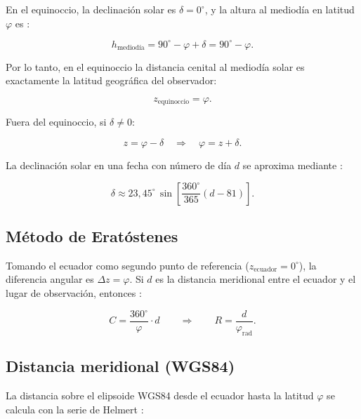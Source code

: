 En el equinoccio, la declinación solar es $\delta = 0^\circ$, y la altura
al mediodía en latitud $\varphi$ es \citep{PortillaBarbosa2009}:

\begin{equation}
  h_\text{mediodía} = 90^\circ - \varphi + \delta = 90^\circ - \varphi.
\end{equation}

Por lo tanto, en el equinoccio la distancia cenital al mediodía solar
es exactamente la latitud geográfica del observador:

\begin{equation}
  \boxed{z_\text{equinoccio} = \varphi}.
  \label{eq:equinoccio}
\end{equation}

Fuera del equinoccio, si $\delta \neq 0$:

\begin{equation}
  z = \varphi - \delta \quad \Rightarrow \quad \varphi = z + \delta.
  \label{eq:latitud}
\end{equation}

La declinación solar en una fecha con número de día $d$ se aproxima
mediante \citep{PortillaBarbosa2009}:

\begin{equation}
  \delta \approx 23{,}45^\circ\,\sin\!\left[\frac{360^\circ}{365}(d - 81)\right].
  \label{eq:declinacion}
\end{equation}

\subsection{Método de Eratóstenes}

Tomando el ecuador como segundo punto de referencia ($z_\text{ecuador} = 0^\circ$),
la diferencia angular es $\Delta z = \varphi$.
Si $d$ es la distancia meridional entre el ecuador y el lugar de
observación, entonces \citep{PortillaBarbosa2009,Britannica2024}:

\begin{equation}
  C = \frac{360^\circ}{\varphi} \cdot d \qquad \Longrightarrow \qquad
  \boxed{R = \frac{d}{\varphi_\text{rad}}}.
  \label{eq:radio}
\end{equation}

\subsection{Distancia meridional (WGS84)}

La distancia sobre el elipsoide WGS84 desde el ecuador hasta la
latitud $\varphi$ se calcula con la serie de Helmert
\citep{Torge2001,NGA2014}:

